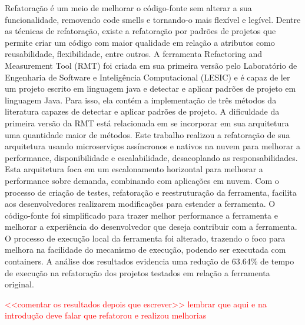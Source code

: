 \begin{Abstract}[brazilian]%
Refatoração é um meio de melhorar o código-fonte sem alterar a sua funcionalidade, removendo code smells e tornando-o mais flexível e legível. Dentre as técnicas de refatoração, existe a refatoração por padrões de projetos que permite criar um código com maior qualidade em relação a atributos como reusabilidade, flexibilidade, entre outros. A ferramenta Refactoring and Measurement Tool (RMT) foi criada em sua primeira versão pelo Laboratório de Engenharia de Software e Inteligência Computacional (LESIC) e é capaz de ler um projeto escrito em linguagem java e detectar e aplicar padrões de projeto em linguagem Java. Para isso, ela contém a implementação de três métodos da literatura capazes de detectar e aplicar padrões de projeto. A dificuldade da primeira versão da RMT está relacionada em se incorporar em sua arquitetura uma quantidade maior de métodos. Este trabalho realizou a refatoração de sua arquitetura usando microserviços assíncronos e nativos na nuvem para melhorar a performance, disponibilidade e escalabilidade, desacoplando as responsabilidades. Esta arquitetura foca em um escalonamento horizontal para melhorar a performance sobre demanda, combinando com aplicações em nuvem. Com o processo de criação de testes, refatoração e reestruturação da ferramenta, facilita aos desenvolvedores realizarem modificações para estender a ferramenta. O código-fonte foi simplificado para trazer melhor performance a ferramenta e melhorar a experiência do desenvolvedor que deseja contribuir com a ferramenta. O processo de execução local da ferramenta foi alterado, trazendo o foco para melhora na facilidade do mecanismo de execução, podendo ser executada com containers. A análise dos resultados evidencia uma redução de 63.64\% de tempo de execução na refatoração dos projetos testados em relação a ferramenta original.

\textcolor{red}{<<comentar os resultados depois que escrever>> lembrar que aqui e na introdução deve falar que refatorou e realizou melhorias}
\end{Abstract}
